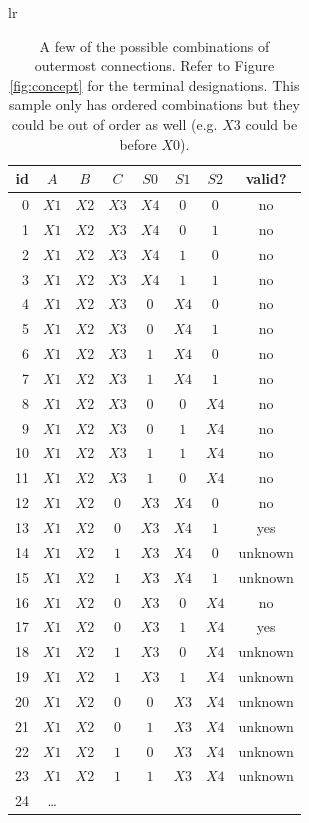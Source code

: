 \documentclass[12pt]{article}
\begin{document}
\begin{table}[tbp]
\begin{center}
\begin{tabular}{lr}
\begin{tabular}[t]{r|cccccc|c}
id&$A$&$B$&$C$&$S0$&$S1$&$S2$&valid?\\
\hline

0 &$X1$&$X2$&$X3$&$X4$&$0$&$0$&no\\
1 &$X1$&$X2$&$X3$&$X4$&$0$&$1$&no\\
2 &$X1$&$X2$&$X3$&$X4$&$1$&$0$&no\\
3 &$X1$&$X2$&$X3$&$X4$&$1$&$1$&no\\

4 &$X1$&$X2$&$X3$&$0$&$X4$&$0$&no\\
5 &$X1$&$X2$&$X3$&$0$&$X4$&$1$&no\\
6 &$X1$&$X2$&$X3$&$1$&$X4$&$0$&no\\
7 &$X1$&$X2$&$X3$&$1$&$X4$&$1$&no\\

8 &$X1$&$X2$&$X3$&$0$&$0$&$X4$&no\\
9 &$X1$&$X2$&$X3$&$0$&$1$&$X4$&no\\
10 &$X1$&$X2$&$X3$&$1$&$1$&$X4$&no\\
11 &$X1$&$X2$&$X3$&$1$&$0$&$X4$&no\\

12 &$X1$&$X2$&$0$&$X3$&$X4$&$0$&no\\
13 &$X1$&$X2$&$0$&$X3$&$X4$&$1$&yes\\
14 &$X1$&$X2$&$1$&$X3$&$X4$&$0$&unknown\\
15 &$X1$&$X2$&$1$&$X3$&$X4$&$1$&unknown\\

16 &$X1$&$X2$&$0$&$X3$&$0$&$X4$&no\\
17 &$X1$&$X2$&$0$&$X3$&$1$&$X4$&yes\\
18 &$X1$&$X2$&$1$&$X3$&$0$&$X4$&unknown\\
19 &$X1$&$X2$&$1$&$X3$&$1$&$X4$&unknown\\

20 &$X1$&$X2$&$0$&$0$&$X3$&$X4$&unknown\\
21 &$X1$&$X2$&$0$&$1$&$X3$&$X4$&unknown\\
22 &$X1$&$X2$&$1$&$0$&$X3$&$X4$&unknown\\
23 &$X1$&$X2$&$1$&$1$&$X3$&$X4$&unknown\\
24 & \ldots
\end{tabular}
\end{tabular}
\end{center}
\caption{A few of the possible combinations of outermost connections.
Refer to Figure \ref{fig:concept} for the terminal designations.
This sample only has ordered combinations but they could be out of
order as well (e.g. $X3$ could be before $X0$).
}
\label{tbl:outcon}
\end{table}
\end{document}
